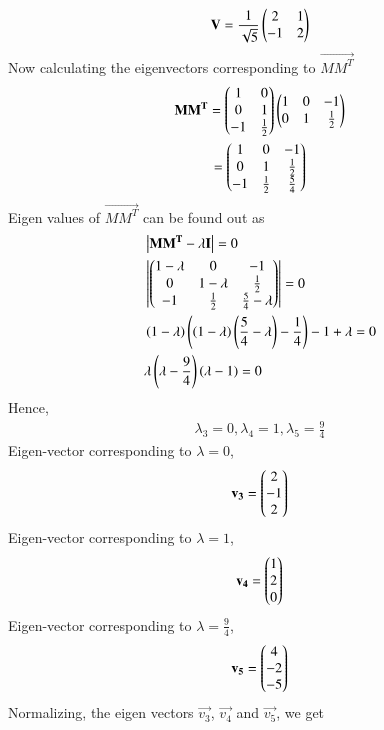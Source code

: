 \documentclass[journal,12pt,twocolumn]{IEEEtran}
\begin{document}
\begin{align}
	\mathbf{V} = \frac{1}{\sqrt{5}}\begin{pmatrix}2 & 1 \\ -1 & 2 \end{pmatrix} \label{5}
\end{align}
Now calculating the eigenvectors corresponding to $\vec{MM^T}$
\begin{multline}
\mathbf{MM^T} = \begin{pmatrix}1 & 0 \\ 0 & 1 \\ -1 & \frac{1}{2}\end{pmatrix}\begin{pmatrix}1 & 0 & -1 \\ 0 & 1 & \frac{1}{2} \end{pmatrix} \\ =
\begin{pmatrix}1 & 0 &-1 \\ 0 & 1 & \frac{1}{2} \\ -1 & \frac{1}{2} & \frac{5}{4}\end{pmatrix}
\end{multline}
Eigen values of $\vec{MM^T}$ can be found out as
\begin{align}
	& \left\vert\mathbf{MM^T-\lambda I}\right\vert = 0 \\
	& \left\vert\begin{pmatrix}1-\lambda & 0 & -1 \\ 0 & 1-\lambda & \frac{1}{2} \\ -1 & \frac{1}{2} & \frac{5}{4}-\lambda\end{pmatrix}\right\vert = 0 \\
	& \left(1-\lambda\right)\left(\left(1-\lambda\right)\left(\frac{5}{4}-\lambda\right)-\frac{1}{4}\right)
	-1+\lambda = 0 \\
	& \lambda\left(\lambda-\frac{9}{4}\right)\left(\lambda-1\right) = 0  
\end{align}
Hence,
\begin{align}
\lambda_3 = 0, \lambda_4 = 1, \lambda_5=\frac{9}{4}
\end{align}
Eigen-vector corresponding to $\lambda=0$,
\begin{align}
	\mathbf{v_3} = \begin{pmatrix}2 \\ -1 \\ 2\end{pmatrix}
\end{align}
Eigen-vector corresponding to $\lambda=1$,
\begin{align}
	\mathbf{v_4} = \begin{pmatrix}1 \\ 2 \\ 0\end{pmatrix}
\end{align}
Eigen-vector corresponding to $\lambda=\frac{9}{4}$,
\begin{align}
	\mathbf{v_5} = \begin{pmatrix}4 \\ -2 \\ -5\end{pmatrix}
\end{align}
Normalizing, the eigen vectors $\vec{v_3}$, $\vec{v_4}$ and $\vec{v_5}$, we get
\end{document}
